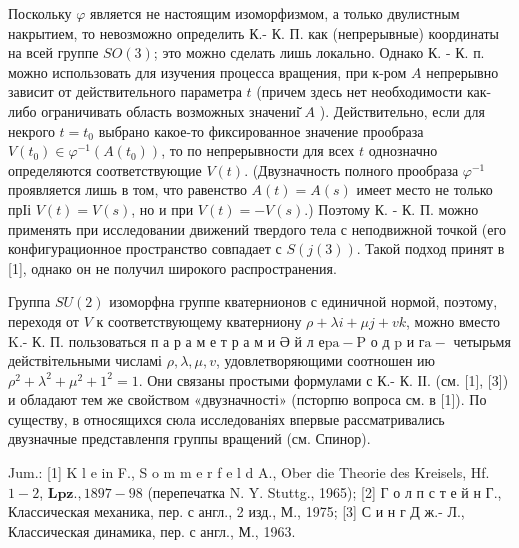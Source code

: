 \documentclass[10pt]{article}
\begin{document}
Поскольку $\varphi$ является не настоящим изоморфизмом, а только двулистным накрытием, то невозможно определить К.- К. П. как (непрерывные) координаты на всей группе $S O(3)$; это можно сделать лишь локально. Однако К. - К. п. можно использовать для изучения процесса вращения, при к-ром $A$ непрерывно зависит от действительного параметра $t$ (причем здесь нет необходимости как-либо ограничивать область возможных значениі̆ $A$ ). Действительно, если для некрого $t=t_{0}$ выбрано какое-то фиксированное значение прообраза $V\left(t_{0}\right) \in \varphi^{-1}\left(A\left(t_{0}\right)\right)$, то по непрерывности для всех $t$ однозначно определяются соответствующие $V(t)$. (Двузначность полного прообраза $\varphi^{-1}$ проявляется лишь в том, что равенство $A(t)=A(s)$ имеет место не только прІі $V(t)=V(s)$, но и при $V(t)=-V(s)$.) Поэтому К. - К. П. можно применять при исследовании движений твердого тела с неподвижной точкой (его конфигурационное пространство совпадает с $S(j(3))$. Такой подход принят в [1], однако он не получил широкого распространения.



Группа $S U(2)$ изоморфна группе кватернионов с единичной нормой, поэтому, переходя от $V$ к соответствующему кватерниону $\rho+\lambda i+\mu j+v k$, можно вместо K.- К. П. пользоваться п а р а м е т р а м и Ә й л е$\mathrm{p} \mathrm{a}-\mathrm{P}$ о д $\mathrm{p}$ и $г \mathrm{a}-$ четырьмя действітельными числамі $\rho, \lambda, \mu, v$, удовлетворяющими соотношен ию $\rho^{2}+\lambda^{2}+\mu^{2}+1^{2}=1$. Они связаны простыми формулами с К.- К. ІІ. (см. [1], [3]) и обладают тем же свойством «двузначності» (псторпю вопроса см. в [1]). По существу, в относящихся сюла исследованіях впервые рассматривались двузначные представленпя группы вращений (см. Спинор).



Jum.: [1] K l e in F., S o m m e r f e l d A., Ober die Theorie des Kreisels, Hf. $1-2$, $\mathbf{L p z} ., 1897-98$ (перепечатка N. Y. Stuttg., 1965); [2] Г о л п с т е й н Г., Классическая механика, пер. с англ., 2 изд., М., 1975; [3] С и н г Д ж.- Л., Классическая динамика, пер. с англ., М., 1963.
\end{document}
